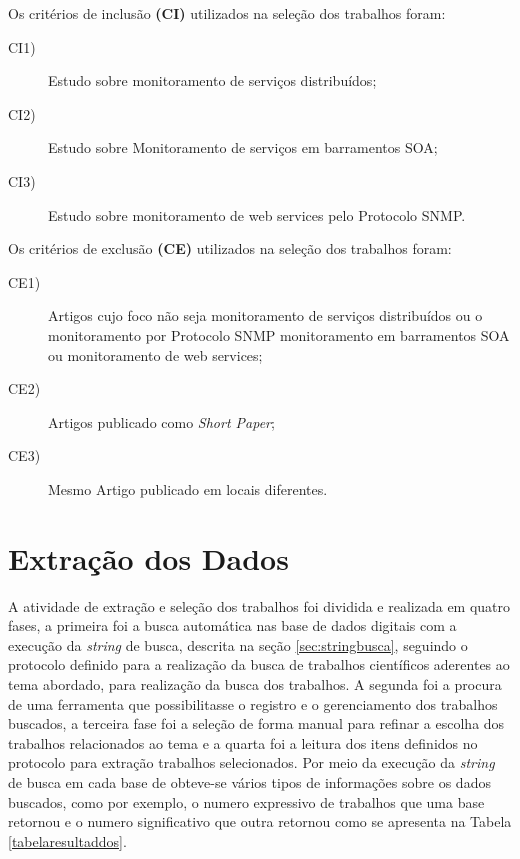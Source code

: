 Os critérios de inclusão \textbf{(CI)} utilizados na seleção dos trabalhos foram:

\begin{description}

\item[CI1)] Estudo sobre monitoramento de serviços distribuídos;
\item[CI2)] Estudo sobre Monitoramento de serviços em barramentos SOA;
\item[CI3)] Estudo sobre monitoramento de web services pelo Protocolo SNMP.
\end{description}

Os critérios de exclusão \textbf{(CE)} utilizados na seleção dos trabalhos foram:

\begin{description}
\item[CE1)]Artigos cujo foco não seja monitoramento de serviços distribuídos ou o monitoramento por Protocolo SNMP monitoramento em barramentos SOA ou monitoramento de web services;
\item[CE2)] Artigos publicado como \textit{Short Paper};
\item[CE3)] Mesmo Artigo publicado em locais diferentes.
\end{description}


\section{Extração dos Dados}
A atividade de extração e seleção dos trabalhos foi dividida e realizada em quatro fases, a primeira foi a busca automática nas base de dados digitais com a execução da \textit{string} de busca, descrita na seção \ref{sec:stringbusca}, seguindo o protocolo definido para a realização da busca de trabalhos científicos aderentes ao tema abordado, para realização da busca dos trabalhos. A segunda foi a procura de uma ferramenta que possibilitasse o registro e o gerenciamento dos trabalhos buscados, a terceira fase foi a seleção de forma manual para refinar a escolha dos trabalhos relacionados ao tema e a quarta foi a leitura dos itens definidos no protocolo para extração trabalhos selecionados.
Por meio da execução da \textit{string} de busca em cada base de obteve-se vários tipos de informações sobre os dados buscados, como por exemplo, o numero expressivo de trabalhos que uma base retornou e o numero significativo que outra retornou como se apresenta na Tabela \ref{tabelaresultaddos}.

